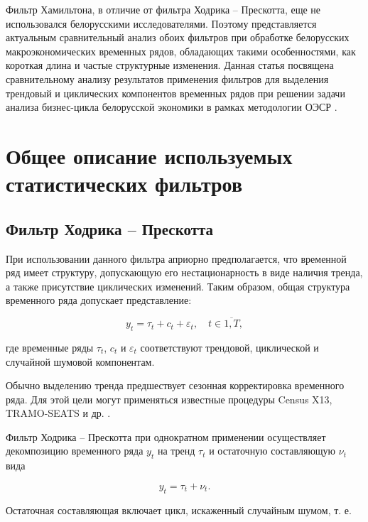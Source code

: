 \documentclass[a4paper,14pt]{extreport}
\begin{document}
	Фильтр Хамильтона, в отличие от фильтра Ходрика -- Прескотта, еще не использовался белорусскими исследователями. Поэтому представляется актуальным сравнительный анализ обоих фильтров при обработке белорусских макроэкономических временных рядов, обладающих такими особенностями, как короткая длина и частые структурные изменения. Данная статья посвящена сравнительному анализу результатов применения фильтров для выделения трендовый и циклических компонентов временных рядов при решении задачи анализа бизнес-цикла белорусской экономики в рамках методологии ОЭСР \cite{oecdCycleExtraction, esiMaking}. 
	
	\section{Общее описание используемых статистических фильтров}
	
	\subsection{Фильтр Ходрика -- Прескотта}
	
	При использовании данного фильтра априорно предполагается, что временной ряд   имеет структуру, допускающую его нестационарность в виде наличия тренда, а также присутствие циклических изменений. Таким образом, общая структура временного ряда допускает представление:
	
	\begin{equation}
	y_t = \tau_t + c_t + \varepsilon_t, \quad t \in \overline{1,T},
	\label{eq:decomposition}
	\end{equation}
	
	где временные ряды  $\tau_t$, $c_t$ и $\varepsilon_t$ соответствуют трендовой, циклической и случайной шумовой компонентам. 
	
	Обычно выделению тренда предшествует сезонная корректировка временного ряда. Для этой цели могут применяться известные процедуры Census X13, TRAMO-SEATS и др. \cite{oecdCycleExtraction, esiMakingAlt}. 
	
	Фильтр Ходрика -- Прескотта при однократном применении осуществляет декомпозицию временного ряда $y_t$ на тренд $\tau_t$ и остаточную составляющую $\nu_t$ вида
	
	\begin{equation}
	y_t = \tau_t + \nu_t .
	\label{eq:decomp1}
	\end{equation}
	
	Остаточная составляющая включает цикл, искаженный случайным шумом, т. е. 
	
\end{document}
